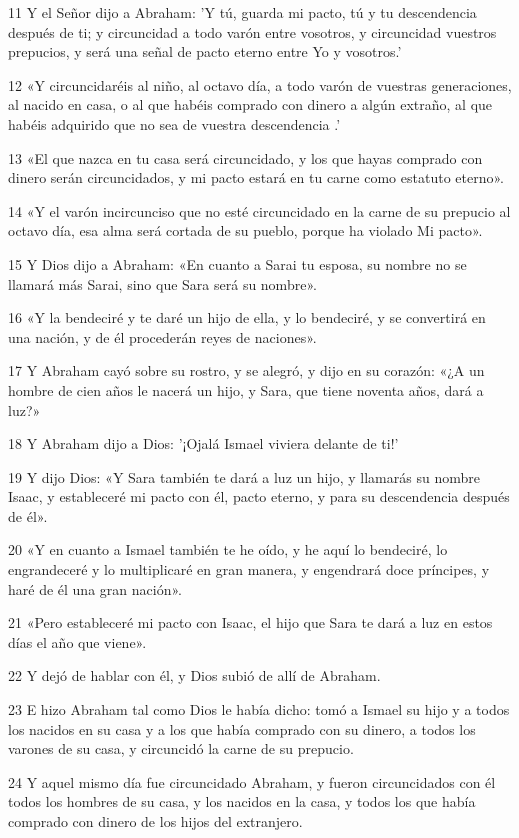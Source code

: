 \par 11 Y el Señor dijo a Abraham: 'Y tú, guarda mi pacto, tú y tu descendencia después de ti; y circuncidad a todo varón entre vosotros, y circuncidad vuestros prepucios, y será una señal de pacto eterno entre Yo y vosotros.'
\par 12 «Y circuncidaréis al niño, al octavo día, a todo varón de vuestras generaciones, al nacido en casa, o al que habéis comprado con dinero a algún extraño, al que habéis adquirido que no sea de vuestra descendencia .'
\par 13 «El que nazca en tu casa será circuncidado, y los que hayas comprado con dinero serán circuncidados, y mi pacto estará en tu carne como estatuto eterno».
\par 14 «Y el varón incircunciso que no esté circuncidado en la carne de su prepucio al octavo día, esa alma será cortada de su pueblo, porque ha violado Mi pacto».
\par 15 Y Dios dijo a Abraham: «En cuanto a Sarai tu esposa, su nombre no se llamará más Sarai, sino que Sara será su nombre».
\par 16 «Y la bendeciré y te daré un hijo de ella, y lo bendeciré, y se convertirá en una nación, y de él procederán reyes de naciones».
\par 17 Y Abraham cayó sobre su rostro, y se alegró, y dijo en su corazón: «¿A un hombre de cien años le nacerá un hijo, y Sara, que tiene noventa años, dará a luz?»
\par 18 Y Abraham dijo a Dios: '¡Ojalá Ismael viviera delante de ti!'
\par 19 Y dijo Dios: «Y Sara también te dará a luz un hijo, y llamarás su nombre Isaac, y estableceré mi pacto con él, pacto eterno, y para su descendencia después de él».
\par 20 «Y en cuanto a Ismael también te he oído, y he aquí lo bendeciré, lo engrandeceré y lo multiplicaré en gran manera, y engendrará doce príncipes, y haré de él una gran nación».
\par 21 «Pero estableceré mi pacto con Isaac, el hijo que Sara te dará a luz en estos días el año que viene».
\par 22 Y dejó de hablar con él, y Dios subió de allí de Abraham.
\par 23 E hizo Abraham tal como Dios le había dicho: tomó a Ismael su hijo y a todos los nacidos en su casa y a los que había comprado con su dinero, a todos los varones de su casa, y circuncidó la carne de su prepucio.
\par 24 Y aquel mismo día fue circuncidado Abraham, y fueron circuncidados con él todos los hombres de su casa, y los nacidos en la casa, y todos los que había comprado con dinero de los hijos del extranjero.
